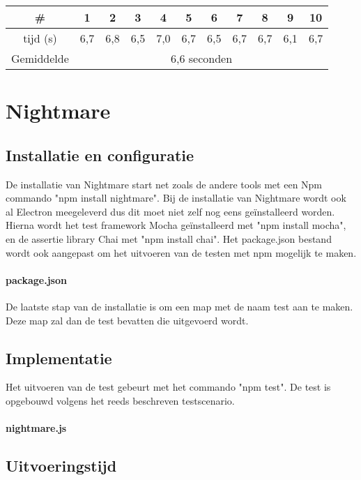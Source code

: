\begin{tabular}{ |c| |c |c |c |c |c |c |c |c |c |c| }
\hline
	\# & 1 & 2 & 3 & 4 & 5 & 6 & 7 & 8 & 9 & 10\\
\hline
	tijd (s) & 6,7 & 6,8 & 6,5 & 7,0 & 6,7 & 6,5 & 6,7 & 6,7 & 6,1 & 6,7\\
\hline
 Gemiddelde & \multicolumn{10}{c|}{6,6 seconden}\\
\hline
\end{tabular}


\clearpage
\section{Nightmare}
\subsection{Installatie en configuratie}
De installatie van Nightmare start net zoals de andere \glspl{tool} met een Npm commando "npm install nightmare". Bij de installatie van Nightmare wordt ook al Electron meegeleverd dus dit moet niet zelf nog eens geïnstalleerd worden. Hierna wordt het test \gls{framework} Mocha geïnstalleerd met "npm install mocha", en de \gls{assertie} \gls{library} Chai met "npm install chai". Het package.json bestand wordt ook aangepast om het uitvoeren van de testen met npm mogelijk te maken.

\paragraph{package.json}

De laatste stap van de installatie is om een map met de naam test aan te maken. Deze map zal dan de test bevatten die uitgevoerd wordt.
\subsection{Implementatie}
Het uitvoeren van de test gebeurt met het commando "npm test". De test is opgebouwd volgens het reeds beschreven testscenario.

\paragraph{nightmare.js}
\subsection{Uitvoeringstijd}


